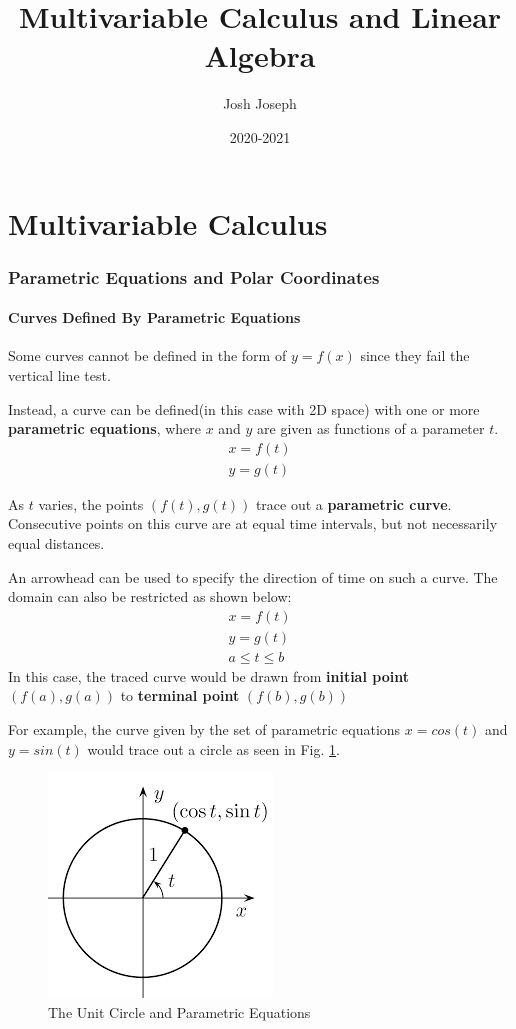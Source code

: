 \documentclass{article}
\title{Multivariable Calculus and Linear Algebra}
\author{Josh Joseph}
\date{2020-2021}
\begin{document}
\maketitle

\tableofcontents
\newpage
\part{Multivariable Calculus}
\setcounter{section}{10}
\section{Parametric Equations and Polar Coordinates}

\subsection{Curves Defined By Parametric Equations}

Some curves cannot be defined in the form of $y=f(x)$ since they fail the vertical line test.

Instead, a curve can be defined(in this case with 2D space) with one or more \textbf{parametric equations}, where $x$ and $y$ are given as functions of a parameter $t$.
\begin{gather*}
    x=f(t)\\
    y=g(t)
\end{gather*}

As $t$ varies, the points $(f(t),g(t))$ trace out a \textbf{parametric curve}. Consecutive points on this curve are at equal time intervals, but not necessarily equal distances.

An arrowhead can be used to specify the direction of time on such a curve. The domain can also be restricted as shown below:
\begin{gather*}
    x=f(t)\\
    y=g(t)\\
    a \leqslant t \leqslant b
\end{gather*}
In this case, the traced curve would be drawn from \textbf{initial point} $(f(a),g(a))$ to \textbf{terminal point} $(f(b),g(b))$

For example, the curve given by the set of parametric equations $x=cos(t)$ and $y=sin(t)$ would trace out a circle as seen in Fig. \ref{unitcirc}. \\
\begin{figure}[H]
\begin{center}
\includegraphics[scale=0.5]{UnitCircle.png}
\caption{The Unit Circle and Parametric Equations}
\label{unitcirc}
\end{center}
\end{figure}
\end{document}
